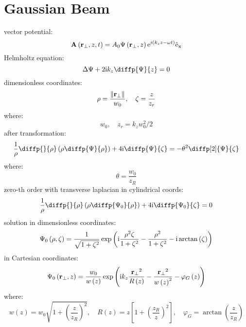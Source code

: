 \section{Gaussian Beam}
vector potential:
\begin{equation}
\mathbf{A}\left(\mathbf{r_\bot}, z, t \right)  = A_0 \Psi\left(\mathbf{r_\bot}, z \right) \mathrm{e}^{i \left(k_z z - \omega t \right)} \mathrm{\hat{e}_x}
\end{equation}
Helmholtz equation:
\begin{equation}
\laplace{\Psi} + 2 \i k_z \diffp{\Psi}{z} = 0
\end{equation}
dimensionless coordinates:
\begin{equation}
\rho = \frac{\lVert\mathbf{r_\bot}\rVert}{w_0}, \quad \zeta = \frac{z}{z_r}
\end{equation}
where:
\begin{equation}
w_0, \quad z_r = k_z w_0^2/2
\end{equation}
after transformation:
\begin{equation}
\frac{1}{\rho} \diffp{}{\rho}\left(\rho \diffp{\Psi}{\rho} \right) + 4 \i \diffp{\Psi}{\zeta}  = - \theta^2 \diffp[2]{\Psi}{\zeta}
\end{equation}
where:
\begin{equation}
\theta = \frac{w_0}{z_R}
\end{equation}
zero-th order with transverse laplacian in cylindrical coords:
\begin{equation}
\frac{1}{\rho} \diffp{}{\rho}\left(\rho \diffp{\Psi_0}{\rho} \right) + 4 \i \diffp{\Psi_0}{\zeta} = 0
\end{equation}
solution in dimensionless coordinates:
\begin{equation}
\Psi_0 \left(\rho, \zeta \right) = \frac{1}{\sqrt{1 + \zeta^2}} \exp{\left(\mathrm{i}\frac{\rho^2 \zeta}{1 + \zeta^2} - \frac{\rho^2}{1 + \zeta^2} - \mathrm{i}\arctan{\left(\zeta\right)} \right)} 
\end{equation}
in Cartesian coordinates:
\begin{equation}
\Psi_0 \left(\mathbf{r_\bot}, z \right) = \frac{w_0}{w\left(z\right)} \exp{\left(\mathrm{i}k_z \frac{\mathbf{r_\bot}^2}{R\left(z \right)} - \frac{\mathbf{r_\bot}^2}{w\left(z \right)^2} - \varphi_G \left( z\right) \right)} 
\end{equation}
where:
\begin{equation}
w\left(z\right) = w_0 \sqrt{1 + \left(\frac{z}{z_R}\right)^2}, \quad R\left(z \right) = z \left[1 + \left(\frac{z_R}{z} \right)^2\right], \quad \varphi_G = \arctan{\left(\frac{z}{z_R}\right)}
\end{equation}
